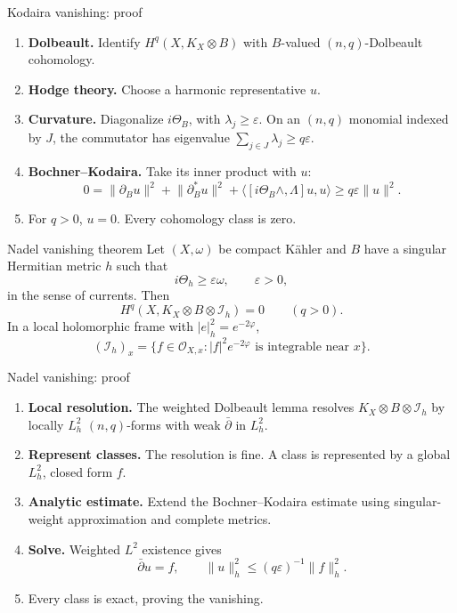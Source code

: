 \documentclass[aspectratio=169,11pt]{beamer}
\newcommand{\cI}{\mathcal I}
\newcommand{\cO}{\mathcal O}
\newcommand{\db}{\bar\partial}
\newcommand{\norm}[1]{\lVert#1\rVert}
\begin{document}
\begin{frame}{Kodaira vanishing: proof}
\begin{enumerate}
\setlength{\itemsep}{7pt}
\item \textbf{Dolbeault.} Identify \(H^q(X,K_X\otimes B)\)
with \(B\)-valued \((n,q)\)-Dolbeault cohomology.
\item \textbf{Hodge theory.} Choose a harmonic representative \(u\).
\item \textbf{Curvature.} Diagonalize \(i\Theta_B\), with
\(\lambda_j\ge\varepsilon\). On an \((n,q)\) monomial indexed by \(J\),
the commutator has eigenvalue
\(\sum_{j\in J}\lambda_j\ge q\varepsilon\).
\item \textbf{Bochner--Kodaira.} Take its inner product with \(u\):
\[
0=\norm{\partial_Bu}^2+\norm{\partial_B^*u}^2
+\langle[i\Theta_B\wedge,\Lambda]u,u\rangle
\ge q\varepsilon\norm{u}^2.
\]
\item For \(q>0\), \(u=0\). Every cohomology class is zero.
\end{enumerate}
\end{frame}

\begin{frame}{Nadel vanishing theorem}
Let \((X,\omega)\) be compact Kähler and \(B\) have a singular
Hermitian metric \(h\) such that
\[
i\Theta_h\ge\varepsilon\omega,\qquad \varepsilon>0,
\]
in the sense of currents. Then
\[
\boxed{H^q(X,K_X\otimes B\otimes\cI_h)=0\qquad(q>0).}
\]
In a local holomorphic frame with \(|e|_h^2=e^{-2\varphi}\),
\[
(\cI_h)_x=\{f\in\cO_{X,x}:|f|^2e^{-2\varphi}
\text{ is integrable near }x\}.
\]
\end{frame}

\begin{frame}{Nadel vanishing: proof}
\begin{enumerate}
\setlength{\itemsep}{7pt}
\item \textbf{Local resolution.} The weighted Dolbeault lemma
resolves \(K_X\otimes B\otimes\cI_h\) by locally \(L^2_h\)
\((n,q)\)-forms with weak \(\db\) in \(L^2_h\).
\item \textbf{Represent classes.} The resolution is fine.
A class is represented by a global \(L^2_h\), closed form \(f\).
\item \textbf{Analytic estimate.} Extend the Bochner--Kodaira estimate
using singular-weight approximation and complete metrics.
\item \textbf{Solve.} Weighted \(L^2\) existence gives
\[
\db u=f,\qquad \norm{u}_h^2\le(q\varepsilon)^{-1}\norm{f}_h^2.
\]
\item Every class is exact, proving the vanishing.
\end{enumerate}
\end{frame}
\end{document}
